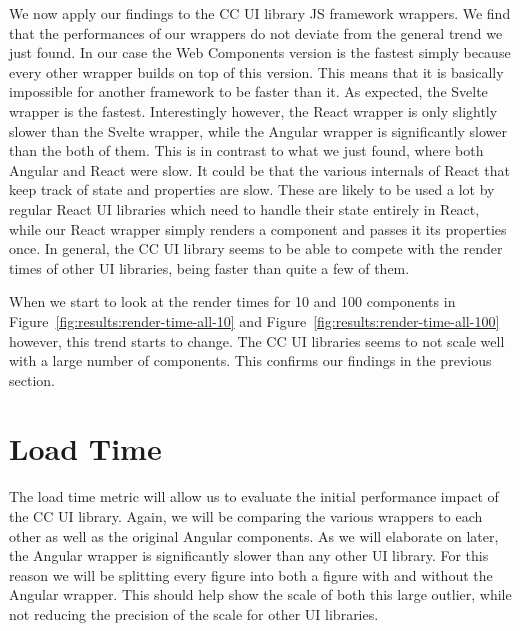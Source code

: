 We now apply our findings to the CC UI library JS framework wrappers. We find that the performances of our wrappers do not deviate from the general trend we just found. In our case the Web Components version is the fastest simply because every other wrapper builds on top of this version. This means that it is basically impossible for another framework to be faster than it. As expected, the Svelte wrapper is the fastest. Interestingly however, the React wrapper is only slightly slower than the Svelte wrapper, while the Angular wrapper is significantly slower than the both of them. This is in contrast to what we just found, where both Angular and React were slow. It could be that the various internals of React that keep track of state and properties are slow. These are likely to be used a lot by regular React UI libraries which need to handle their state entirely in React, while our React wrapper simply renders a component and passes it its properties once. In general, the CC UI library seems to be able to compete with the render times of other UI libraries, being faster than quite a few of them.

When we start to look at the render times for 10 and 100 components in Figure~\ref{fig:results:render-time-all-10} and Figure~\ref{fig:results:render-time-all-100} however, this trend starts to change. The CC UI libraries seems to not scale well with a large number of components. This confirms our findings in the previous section.

\section{Load Time}
The load time metric will allow us to evaluate the initial performance impact of the CC UI library. Again, we will be comparing the various wrappers to each other as well as the original Angular components. As we will elaborate on later, the Angular wrapper is significantly slower than any other UI library. For this reason we will be splitting every figure into both a figure with and without the Angular wrapper. This should help show the scale of both this large outlier, while not reducing the precision of the scale for other UI libraries.

